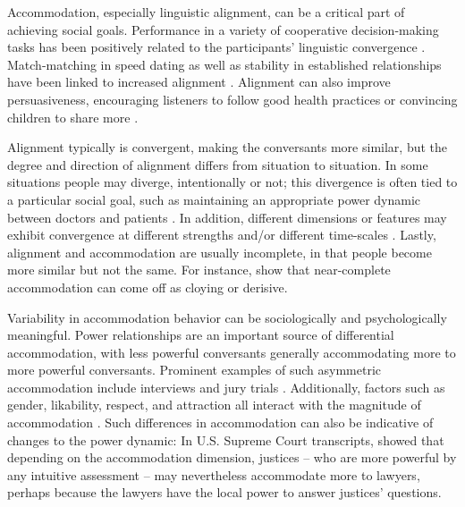 \documentclass{acm_proc_article-sp}
\begin{document}
Accommodation, especially linguistic alignment, can be a critical part of achieving social goals.  Performance in a variety of cooperative decision-making tasks has been positively related to the participants' linguistic convergence \cite{FusaroliEtAl2012,KacewiczEtAl2013}.  Match-matching in speed dating as well as stability in established relationships have been linked to increased alignment \cite{IrelandEtAl2011}.  Alignment can also improve persuasiveness, encouraging listeners to follow good health practices \cite{KlineCeropski1984} or convincing children to share more \cite{BurlesonFennelly1981}.

Alignment typically is convergent, making the conversants more similar, but the degree and direction of alignment differs from situation to situation. In some situations people may diverge, intentionally or not; this divergence is often tied to a particular social goal, such as maintaining an appropriate power dynamic between doctors and patients \cite{Ferrara1991}. In addition, different dimensions or features may exhibit convergence at different strengths \cite{ThakerarGilesCheshire1982,BilousKrauss1988,DNMGamonDumais2011} and/or different time-scales \cite{Ferrara1991}.  Lastly, alignment and accommodation are usually incomplete, in that people become more similar but not the same. For instance, \cite{GilesCouplandCoupland1991,GilesSmith1979} show that near-complete accommodation can come off as cloying or derisive.

Variability in accommodation behavior can be sociologically and psychologically meaningful.  Power relationships are an important source of differential accommodation, with less powerful conversants generally accommodating more to more powerful conversants. Prominent examples of such asymmetric accommodation include interviews and jury trials \cite{WillemynsEtAl1997,Gnisci2005,DNMEtAl2012}.  Additionally, factors such as gender, likability, respect, and attraction all interact with the magnitude of accommodation \cite{BilousKrauss1988,Natale1975}. Such differences in accommodation can also be indicative of changes to the power dynamic: In U.S. Supreme Court transcripts, \cite{guo2015} showed that depending on the accommodation dimension, justices -- who are more powerful by any intuitive assessment -- may nevertheless accommodate more to lawyers, perhaps because the lawyers have the local power to answer justices' questions.
\end{document}
